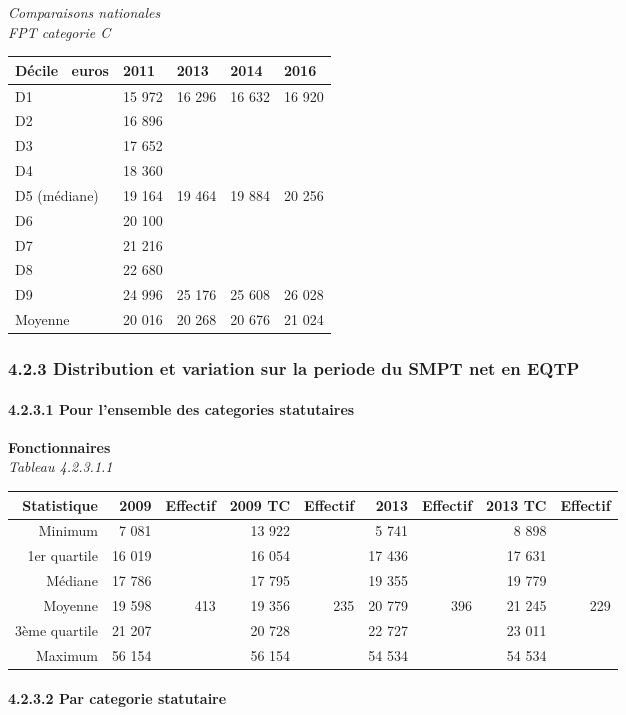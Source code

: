 \emph{Comparaisons nationales}\\
\emph{FPT categorie C}

\begin{longtable}[]{@{}lllll@{}}
\toprule
Décile ~euros & 2011 & 2013 & 2014 & 2016\tabularnewline
\midrule
\endhead
D1 & 15 972 & 16 296 & 16 632 & 16 920\tabularnewline
D2 & 16 896 & & &\tabularnewline
D3 & 17 652 & & &\tabularnewline
D4 & 18 360 & & &\tabularnewline
D5 (médiane) & 19 164 & 19 464 & 19 884 & 20 256\tabularnewline
D6 & 20 100 & & &\tabularnewline
D7 & 21 216 & & &\tabularnewline
D8 & 22 680 & & &\tabularnewline
D9 & 24 996 & 25 176 & 25 608 & 26 028\tabularnewline
Moyenne & 20 016 & 20 268 & 20 676 & 21 024\tabularnewline
\bottomrule
\end{longtable}

\hypertarget{distribution-et-variation-sur-la-periode-du-smpt-net-en-eqtp}{%
\subsubsection{4.2.3 Distribution et variation sur la periode du SMPT
net en
EQTP}\label{distribution-et-variation-sur-la-periode-du-smpt-net-en-eqtp}}

\hypertarget{pour-lensemble-des-categories-statutaires}{%
\paragraph{4.2.3.1 Pour l'ensemble des categories
statutaires}\label{pour-lensemble-des-categories-statutaires}}

\textbf{Fonctionnaires}\\
\hspace*{0.333em}\emph{Tableau 4.2.3.1.1}

\begin{longtable}[]{@{}rrrrrrrrr@{}}
\toprule
Statistique & 2009 & Effectif & 2009 TC & Effectif & 2013 & Effectif &
2013 TC & Effectif\tabularnewline
\midrule
\endhead
Minimum & 7 081 & & 13 922 & & 5 741 & & 8 898 &\tabularnewline
1er quartile & 16 019 & & 16 054 & & 17 436 & & 17 631 &\tabularnewline
Médiane & 17 786 & & 17 795 & & 19 355 & & 19 779 &\tabularnewline
Moyenne & 19 598 & 413 & 19 356 & 235 & 20 779 & 396 & 21 245 &
229\tabularnewline
3ème quartile & 21 207 & & 20 728 & & 22 727 & & 23 011 &\tabularnewline
Maximum & 56 154 & & 56 154 & & 54 534 & & 54 534 &\tabularnewline
\bottomrule
\end{longtable}

\hypertarget{par-categorie-statutaire-1}{%
\paragraph{4.2.3.2 Par categorie
statutaire}\label{par-categorie-statutaire-1}}

